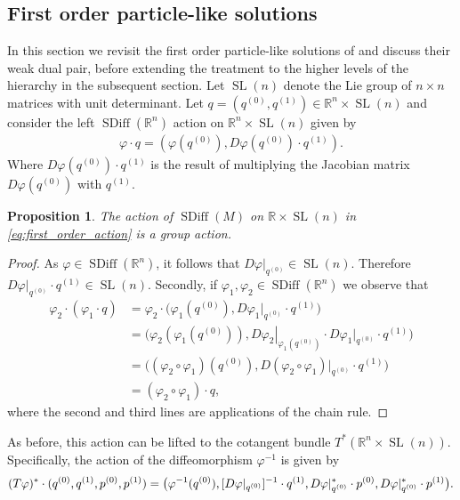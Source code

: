 \documentclass[12pt]{amsart}
\newcommand{\R}{\ensuremath{\mathbb{R}}}
\newtheorem{prop}[thm]{Proposition}
\DeclareMathOperator{\SDiff}{SDiff}
\DeclareMathOperator{\SL}{SL}
\begin{document}
\subsection{First order particle-like solutions}
\label{sec:first_order}
In this section we revisit the first order particle-like solutions of \cite{CotterHolmJacobsMeier2014} and discuss their weak dual pair, before extending the treatment to the higher levels of the hierarchy in the subsequent section. 
  Let $\SL(n)$ denote the Lie group of $n\times n$ matrices
  with unit determinant.
  Let $q = (q^{(0)}, q^{(1)}) \in \R^n \times \SL(n)$ and consider the left
  $\SDiff(\R^n)$ action on $\R^n \times \SL(n)$ given by
  \begin{align}
    \varphi \cdot q = (\varphi(q^{(0)} ) , D\varphi(q^{(0)} ) \cdot q^{(1)} ). \label{eq:first_order_action}
  \end{align}
  Where $D\varphi(q^{(0)} ) \cdot q^{(1)}$ is the result of multiplying
  the Jacobian matrix $D\varphi(q^{(0)} )$ with $q^{(1)}$.
  \begin{prop}
    The action of $\SDiff(M)$ on $\R \times \SL(n)$ in \eqref{eq:first_order_action} is a group action.
  \end{prop}
  \begin{proof}
    As $\varphi \in \SDiff(\R^n)$, it follows that $D\varphi |_{q^{(0)}} \in \SL(n)$.
    Therefore $D\varphi |_{q^{(0)}} \cdot q^{(1)} \in \SL(n)$.
    Secondly, if $\varphi_1,\varphi_2 \in \SDiff(\R^n)$ we observe that
    \begin{align*}
      \varphi_2 \cdot (\varphi_1 \cdot q)
      &= \varphi_2 \cdot \big(\varphi_1(q^{(0)} ) , D\varphi_1 |_{q^{(0)}} \cdot q^{(1)} \big) \\
      &= \big(\varphi_2(\varphi_1(q^{(0)} )) , \left. D\varphi_2 \right|_{\varphi_1( q^{(0)} )} \cdot D\varphi_1 |_{ q^{(0)} } \cdot q^{(1)} \big) \\
      &= \big( (\varphi_2 \circ \varphi_1)(q^{(0)} ) , D( \varphi_2 \circ \varphi_1)|_{q^{(0)} } \cdot q^{(1)} \big) \\
      &= (\varphi_2 \circ \varphi_1) \cdot q,
    \end{align*}
    where the second and third lines are applications of the chain rule.
  \end{proof}
  As before, this action can be lifted to the cotangent bundle $T^*(\R^n \times \SL(n))$.  Specifically, 
  the action of the diffeomorphism $\varphi^{-1}$ is given by
  \begin{equation}\label{eq:SDiff_cotangent_action_Q1}
    (T\varphi)^* \cdot ( q^{(0)} , q^{(1)}  , p^{(0)} , p^{(1)} ) \\
    = \big( \varphi^{-1}(q^{(0)})  , [D\varphi|_{q^{(0)}}]^{-1} \cdot q^{(1)} , D\varphi|_{q^{(0)}}^* \cdot p^{(0)} , D\varphi|_{q^{(0)}}^* \cdot p^{(1)} \big).
  \end{equation}
\end{document}

